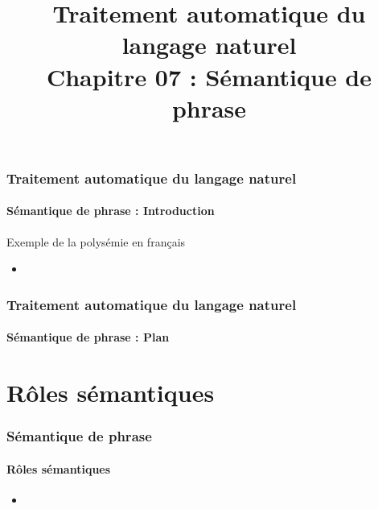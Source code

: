\documentclass[xcolor=table]{beamer}
\title[TALN : 07- Sémantique de phrase]%
{Traitement automatique du langage naturel\\Chapitre 07 : Sémantique de phrase}
\begin{document}
	
\begin{frame}
\frametitle{Traitement automatique du langage naturel}
\framesubtitle{Sémantique de phrase : Introduction}

\begin{exampleblock}{Exemple de la polysémie en français}
	\begin{center}
		\Large\bfseries
		
	\end{center}
\end{exampleblock}

\begin{itemize}
	\item 
\end{itemize}

\end{frame}

%
%

\begin{frame}
\frametitle{Traitement automatique du langage naturel}
\framesubtitle{Sémantique de phrase : Plan}

\begin{multicols}{2}
\tableofcontents
\end{multicols}
\end{frame}

\section{Rôles sémantiques}

\begin{frame}
\frametitle{Sémantique de phrase}
\framesubtitle{Rôles sémantiques}
	
	\begin{itemize}
		\item 
	\end{itemize}
	
\end{frame}
\end{document}
